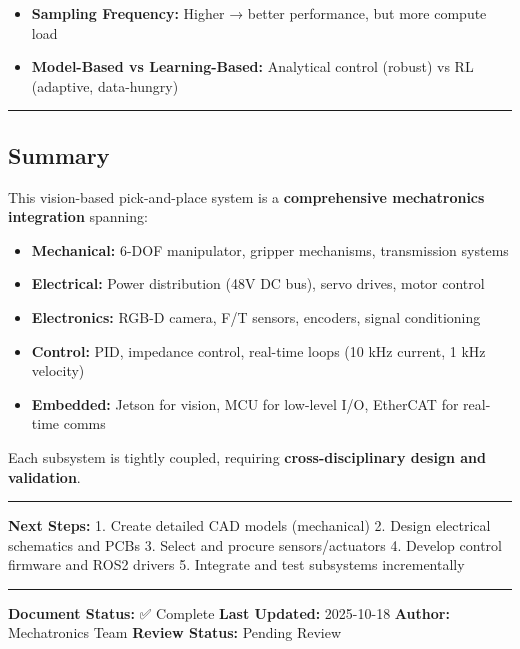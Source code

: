 \documentclass[
]{article}
\providecommand{\tightlist}{%
  \setlength{\itemsep}{0pt}\setlength{\parskip}{0pt}}
\begin{document}
\begin{itemize}
\tightlist
\item
  \textbf{Sampling Frequency:} Higher → better performance, but more
  compute load
\item
  \textbf{Model-Based vs Learning-Based:} Analytical control (robust) vs
  RL (adaptive, data-hungry)
\end{itemize}

\begin{center}\rule{0.5\linewidth}{0.5pt}\end{center}

\hypertarget{summary}{%
\subsection{Summary}\label{summary}}

This vision-based pick-and-place system is a \textbf{comprehensive
mechatronics integration} spanning:

\begin{itemize}
\tightlist
\item
  \textbf{Mechanical:} 6-DOF manipulator, gripper mechanisms,
  transmission systems
\item
  \textbf{Electrical:} Power distribution (48V DC bus), servo drives,
  motor control
\item
  \textbf{Electronics:} RGB-D camera, F/T sensors, encoders, signal
  conditioning
\item
  \textbf{Control:} PID, impedance control, real-time loops (10 kHz
  current, 1 kHz velocity)
\item
  \textbf{Embedded:} Jetson for vision, MCU for low-level I/O, EtherCAT
  for real-time comms
\end{itemize}

Each subsystem is tightly coupled, requiring \textbf{cross-disciplinary
design and validation}.

\begin{center}\rule{0.5\linewidth}{0.5pt}\end{center}

\textbf{Next Steps:} 1. Create detailed CAD models (mechanical) 2.
Design electrical schematics and PCBs 3. Select and procure
sensors/actuators 4. Develop control firmware and ROS2 drivers 5.
Integrate and test subsystems incrementally

\begin{center}\rule{0.5\linewidth}{0.5pt}\end{center}

\textbf{Document Status:} ✅ Complete \textbf{Last Updated:} 2025-10-18
\textbf{Author:} Mechatronics Team \textbf{Review Status:} Pending
Review
\end{document}
